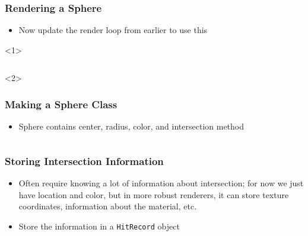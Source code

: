 \documentclass{beamer}
\begin{document}
\begin{frame}[fragile]
	\frametitle{Rendering a Sphere}
	\begin{itemize}
		\item Now update the render loop from earlier to use this
	\end{itemize}
	\begin{onlyenv}
		\inputminted{python}{scripts/sphereRender.py}
	\end{onlyenv}
\end{frame}

\begin{frame}[fragile]
	\frametitle{Making a Sphere Class}
	\begin{itemize}
		\item Sphere contains center, radius, color, and intersection method
	\end{itemize}
	\inputminted[fontsize=\footnotesize]{python}{scripts/sphereClass.py}
\end{frame}

\begin{frame}[fragile]
	\frametitle{Storing Intersection Information}
	\begin{itemize}
		\item Often require knowing a lot of information about intersection; for now we just have location and color, but in more robust renderers, it can store texture coordinates, information about the material, etc.
		\item Store the information in a \texttt{HitRecord} object
	\end{itemize}
	\inputminted{python}{scripts/HitRecord.py}
\end{frame}
\end{document}

